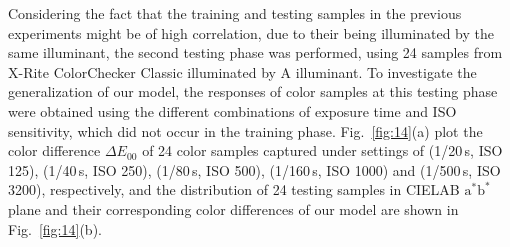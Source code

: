 \documentclass[9pt,twocolumn,twoside]{osajnl}
\begin{document}
	Considering the fact that the training and testing samples in the previous experiments might be of high correlation, due to their being illuminated by the same illuminant, the second testing phase was performed, using 24 samples from X-Rite ColorChecker Classic illuminated by A illuminant. To investigate the generalization of our model, the responses of color samples at this testing phase were obtained using the different combinations of exposure time and ISO sensitivity, which did not occur in the training phase. Fig.~\ref{fig:14}(a) plot the color difference $\Delta{}E_{00}$ of 24 color samples captured under settings of (1/20\,s, ISO 125), (1/40\,s, ISO 250), (1/80\,s, ISO 500), (1/160\,s, ISO 1000) and (1/500\,s, ISO 3200), respectively, and the distribution of 24 testing samples in CIELAB $\text{a}^*\text{b}^*$ plane and their corresponding color differences of our model are shown in Fig.~\ref{fig:14}(b).
	
\end{document}
